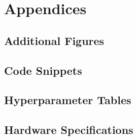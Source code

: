 \chapter{Appendices}
\section{Additional Figures}
\section{Code Snippets}
\section{Hyperparameter Tables}
\section{Hardware Specifications}
